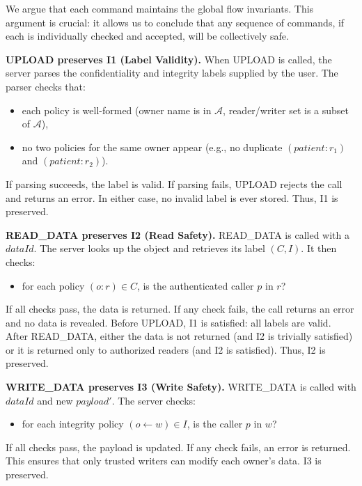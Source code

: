 We argue that each command maintains the global flow invariants. This argument is crucial: it allows us to conclude that any sequence of commands, if each is individually checked and accepted, will be collectively safe.

\textbf{UPLOAD preserves I1 (Label Validity).} When UPLOAD is called, the server parses the confidentiality and integrity labels supplied by the user. The parser checks that:
\begin{itemize}
    \item each policy is well-formed (owner name is in $\mathcal{A}$, reader/writer set is a subset of $\mathcal{A}$),
    \item no two policies for the same owner appear (e.g., no duplicate $(patient:r_1)$ and $(patient:r_2)$).
\end{itemize}
If parsing succeeds, the label is valid. If parsing fails, UPLOAD rejects the call and returns an error. In either case, no invalid label is ever stored. Thus, I1 is preserved.

\textbf{READ\_DATA preserves I2 (Read Safety).} READ\_DATA is called with a $dataId$. The server looks up the object and retrieves its label $(C, I)$. It then checks:
\begin{itemize}
    \item for each policy $(o:r) \in C$, is the authenticated caller $p$ in $r$?
\end{itemize}
If all checks pass, the data is returned. If any check fails, the call returns an error and no data is revealed. Before UPLOAD, I1 is satisfied: all labels are valid. After READ\_DATA, either the data is not returned (and I2 is trivially satisfied) or it is returned only to authorized readers (and I2 is satisfied). Thus, I2 is preserved.

\textbf{WRITE\_DATA preserves I3 (Write Safety).} WRITE\_DATA is called with $dataId$ and new $payload'$. The server checks:
\begin{itemize}
    \item for each integrity policy $(o \leftarrow w) \in I$, is the caller $p$ in $w$?
\end{itemize}
If all checks pass, the payload is updated. If any check fails, an error is returned. This ensures that only trusted writers can modify each owner's data. I3 is preserved.

